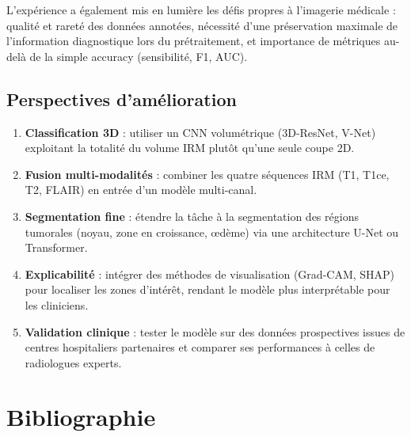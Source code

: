 \documentclass[12pt, a4paper]{report}
\begin{document}
L'expérience a également mis en lumière les défis propres à l'imagerie médicale :
qualité et rareté des données annotées, nécessité d'une préservation maximale
de l'information diagnostique lors du prétraitement, et importance de métriques
au-delà de la simple accuracy (sensibilité, F1, AUC).

\section{Perspectives d'amélioration}

\begin{enumerate}
  \item \textbf{Classification 3D} : utiliser un CNN volumétrique (3D-ResNet, V-Net)
        exploitant la totalité du volume IRM plutôt qu'une seule coupe 2D.

  \item \textbf{Fusion multi-modalités} : combiner les quatre séquences IRM
        (T1, T1ce, T2, FLAIR) en entrée d'un modèle multi-canal.

  \item \textbf{Segmentation fine} : étendre la tâche à la segmentation des régions
        tumorales (noyau, zone en croissance, œdème) via une architecture U-Net ou Transformer.

  \item \textbf{Explicabilité} : intégrer des méthodes de visualisation (Grad-CAM, SHAP)
        pour localiser les zones d'intérêt, rendant le modèle plus interprétable
        pour les cliniciens.

  \item \textbf{Validation clinique} : tester le modèle sur des données prospectives
        issues de centres hospitaliers partenaires et comparer ses performances
        à celles de radiologues experts.
\end{enumerate}

\chapter*{Bibliographie}
\end{document}
